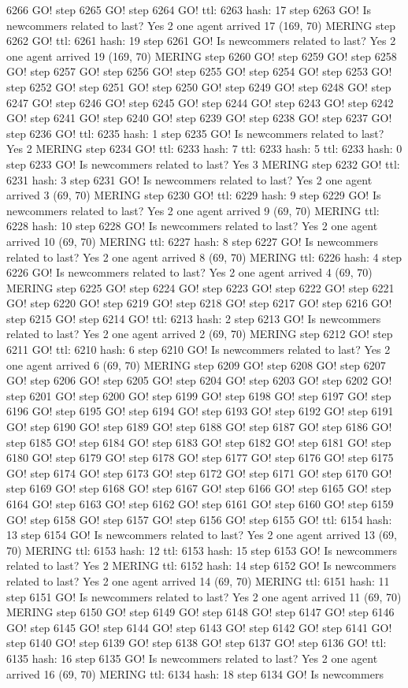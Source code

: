 6266 GO! step 6265 GO! step 6264 GO! ttl: 6263 hash: 17 step 6263 GO! Is newcommers related to last? Yes 2 one agent arrived 17 (169, 70) MERING step 6262 GO! ttl: 6261 hash: 19 step 6261 GO! Is newcommers related to last? Yes 2 one agent arrived 19 (169, 70) MERING step 6260 GO! step 6259 GO! step 6258 GO! step 6257 GO! step 6256 GO! step 6255 GO! step 6254 GO! step 6253 GO! step 6252 GO! step 6251 GO! step 6250 GO! step 6249 GO! step 6248 GO! step 6247 GO! step 6246 GO! step 6245 GO! step 6244 GO! step 6243 GO! step 6242 GO! step 6241 GO! step 6240 GO! step 6239 GO! step 6238 GO! step 6237 GO! step 6236 GO! ttl: 6235 hash: 1 step 6235 GO! Is newcommers related to last? Yes 2 MERING step 6234 GO! ttl: 6233 hash: 7 ttl: 6233 hash: 5 ttl: 6233 hash: 0 step 6233 GO! Is newcommers related to last? Yes 3 MERING step 6232 GO! ttl: 6231 hash: 3 step 6231 GO! Is newcommers related to last? Yes 2 one agent arrived 3 (69, 70) MERING step 6230 GO! ttl: 6229 hash: 9 step 6229 GO! Is newcommers related to last? Yes 2 one agent arrived 9 (69, 70) MERING ttl: 6228 hash: 10 step 6228 GO! Is newcommers related to last? Yes 2 one agent arrived 10 (69, 70) MERING ttl: 6227 hash: 8 step 6227 GO! Is newcommers related to last? Yes 2 one agent arrived 8 (69, 70) MERING ttl: 6226 hash: 4 step 6226 GO! Is newcommers related to last? Yes 2 one agent arrived 4 (69, 70) MERING step 6225 GO! step 6224 GO! step 6223 GO! step 6222 GO! step 6221 GO! step 6220 GO! step 6219 GO! step 6218 GO! step 6217 GO! step 6216 GO! step 6215 GO! step 6214 GO! ttl: 6213 hash: 2 step 6213 GO! Is newcommers related to last? Yes 2 one agent arrived 2 (69, 70) MERING step 6212 GO! step 6211 GO! ttl: 6210 hash: 6 step 6210 GO! Is newcommers related to last? Yes 2 one agent arrived 6 (69, 70) MERING step 6209 GO! step 6208 GO! step 6207 GO! step 6206 GO! step 6205 GO! step 6204 GO! step 6203 GO! step 6202 GO! step 6201 GO! step 6200 GO! step 6199 GO! step 6198 GO! step 6197 GO! step 6196 GO! step 6195 GO! step 6194 GO! step 6193 GO! step 6192 GO! step 6191 GO! step 6190 GO! step 6189 GO! step 6188 GO! step 6187 GO! step 6186 GO! step 6185 GO! step 6184 GO! step 6183 GO! step 6182 GO! step 6181 GO! step 6180 GO! step 6179 GO! step 6178 GO! step 6177 GO! step 6176 GO! step 6175 GO! step 6174 GO! step 6173 GO! step 6172 GO! step 6171 GO! step 6170 GO! step 6169 GO! step 6168 GO! step 6167 GO! step 6166 GO! step 6165 GO! step 6164 GO! step 6163 GO! step 6162 GO! step 6161 GO! step 6160 GO! step 6159 GO! step 6158 GO! step 6157 GO! step 6156 GO! step 6155 GO! ttl: 6154 hash: 13 step 6154 GO! Is newcommers related to last? Yes 2 one agent arrived 13 (69, 70) MERING ttl: 6153 hash: 12 ttl: 6153 hash: 15 step 6153 GO! Is newcommers related to last? Yes 2 MERING ttl: 6152 hash: 14 step 6152 GO! Is newcommers related to last? Yes 2 one agent arrived 14 (69, 70) MERING ttl: 6151 hash: 11 step 6151 GO! Is newcommers related to last? Yes 2 one agent arrived 11 (69, 70) MERING step 6150 GO! step 6149 GO! step 6148 GO! step 6147 GO! step 6146 GO! step 6145 GO! step 6144 GO! step 6143 GO! step 6142 GO! step 6141 GO! step 6140 GO! step 6139 GO! step 6138 GO! step 6137 GO! step 6136 GO! ttl: 6135 hash: 16 step 6135 GO! Is newcommers related to last? Yes 2 one agent arrived 16 (69, 70) MERING ttl: 6134 hash: 18 step 6134 GO! Is newcommers 